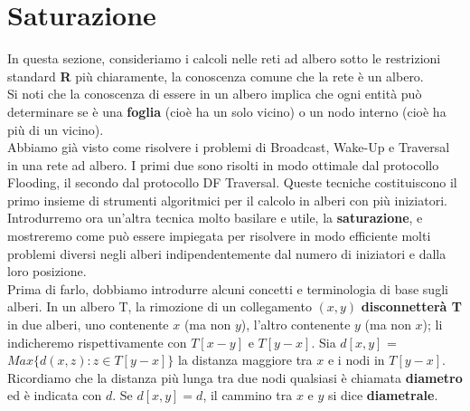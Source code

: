 \chapter{Saturazione}\label{cap:saturazione}

In questa sezione, consideriamo i
calcoli nelle reti ad albero sotto le restrizioni standard \textbf{R} più
chiaramente, la conoscenza comune che la rete è un albero.\\
Si noti che la conoscenza di essere in un albero implica che ogni entità può
determinare se è una \textbf{foglia} (cioè ha un solo vicino) o un nodo interno
(cioè ha più di un vicino).\\
Abbiamo già visto come risolvere i problemi di Broadcast, Wake-Up e Traversal in
una rete ad albero. I primi due sono risolti in modo ottimale dal protocollo
Flooding, il secondo dal protocollo DF Traversal. Queste tecniche costituiscono
il primo insieme di strumenti algoritmici per il calcolo in alberi con più
iniziatori. Introdurremo ora un'altra tecnica molto basilare e utile, la
\textbf{saturazione}, e mostreremo come può essere impiegata per risolvere in
modo efficiente molti problemi diversi negli alberi indipendentemente dal numero
di iniziatori e dalla loro posizione.\\
Prima di farlo, dobbiamo introdurre alcuni concetti e terminologia di base sugli
alberi. In un albero T, la rimozione di un collegamento $(x,y)$
\textbf{disconnetterà T} in due alberi, uno contenente $x$ (ma non $y$), l'altro
contenente $y$ (ma non $x$); li indicheremo rispettivamente con $T[x - y]$ e
$T[y - x]$. Sia $d[x, y]$ = $Max\{d(x, z) : z \in T[y - x]\}$ la distanza
maggiore tra $x$ e i nodi in $T[y - x]$. Ricordiamo che la distanza più lunga
tra due nodi qualsiasi è chiamata \textbf{diametro} ed è indicata con $d$. Se
$d[x, y] = d$, il cammino tra $x$ e $y$ si dice \textbf{diametrale}.

